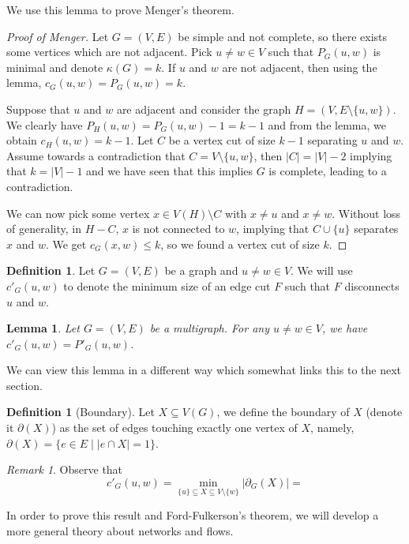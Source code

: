 \documentclass{tufte-handout}
\newtheorem{lem}[thm]{Lemma}
\theoremstyle{definition}
\newtheorem{defn}[thm]{Definition}
\theoremstyle{remark}
\newtheorem{rem}[thm]{Remark}
\begin{document}
We use this lemma to prove Menger's theorem.
\begin{proof}[Proof of Menger]
	Let $G = (V,E)$ be simple and not complete, so there exists some vertices which are not adjacent. Pick $u \neq w \in V$ such that $P_G(u,w)$ is minimal and denote $\kappa(G) = k$. If $u$ and $w$ are not adjacent, then using the lemma, $c_G(u,w) = P_G(u,w) = k$.
	
	Suppose that $u$ and $w$ are adjacent and consider the graph $H= (V, E\setminus \{u,w\})$. We clearly have $P_H(u,w) = P_G(u,w) -1 = k-1$ and from the lemma, we obtain $c_H(u,w) = k-1$. Let $C$ be a vertex cut of size $k-1$ separating $u$ and $w$. Assume towards a contradiction that $C = V \setminus \{u,w\}$, then $|C| = |V|-2$ implying that $k=|V|-1$ and we have seen that this implies $G$ is complete, leading to a contradiction.
	
	We can now pick some vertex $x \in V(H) \setminus C$ with $x \neq u$ and $x \neq w$. Without loss of generality, in $H-C$, $x$ is not connected to $w$, implying that $C \cup \{u\}$ separates $x$ and $w$. We get $c_G(x,w) \leq k$, so we found a vertex cut of size $k$.
\end{proof}
\begin{defn}
	Let $G = (V,E)$ be a graph and $u \neq w \in V$. We will use $c'_G(u,w)$ to denote the minimum size of an edge cut $F$ such that $F$ disconnects $u$ and $w$.
\end{defn}
\begin{lem}
	Let $G=(V,E)$ be a multigraph. For any $u \neq w \in V$, we have $c'_G(u,w) = P'_G(u,w)$.
\end{lem}
We can view this lemma in a different way which somewhat links this to the next section.
\begin{defn}[Boundary]
	Let $X \subseteq V(G)$, we define the boundary of $X$ (denote it $\partial(X)$) as the set of edges touching exactly one vertex of $X$, namely, $\partial(X) = \{e \in E \mid |e \cap X| = 1\}$.
\end{defn}
\begin{rem}
	Observe that \[c'_G(u,w) = \min_{\{u\} \subseteq X \subseteq V \setminus \{w\}} |\partial_G(X)| =  \]
\end{rem}

In order to prove this result and Ford-Fulkerson's theorem, we will develop a more general theory about networks and flows.
\end{document}
